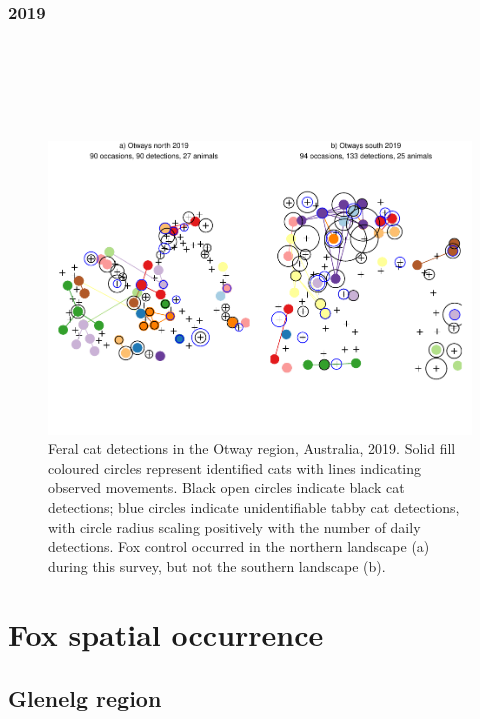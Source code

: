 \documentclass[11pt,a4paper,titlepage,twoside,openright]{style/unimelbthesis}
\begin{document}
\begin{mainmatter}
\hypertarget{section-2}{%
\subsubsection{2019}\label{section-2}}

\(~\)

\(~\)

\(~\)
\begin{figure}

{\centering \includegraphics[width=1\linewidth]{figure/density-plot-ch-6-1} 

}

\caption{Feral cat detections in the Otway region, Australia, 2019. Solid fill coloured circles represent identified cats with lines indicating observed movements. Black open circles indicate black cat detections; blue circles indicate unidentifiable tabby cat detections, with circle radius scaling positively with the number of daily detections. Fox control occurred in the northern landscape (a) during this survey, but not the southern landscape (b).}\label{fig:density-plot-ch-6}
\end{figure}
\newpage

\hypertarget{density-app-fox}{%
\section{Fox spatial occurrence}\label{density-app-fox}}

\hypertarget{glenelg-region-4}{%
\subsection{Glenelg region}\label{glenelg-region-4}}


\end{mainmatter}
\end{document}
